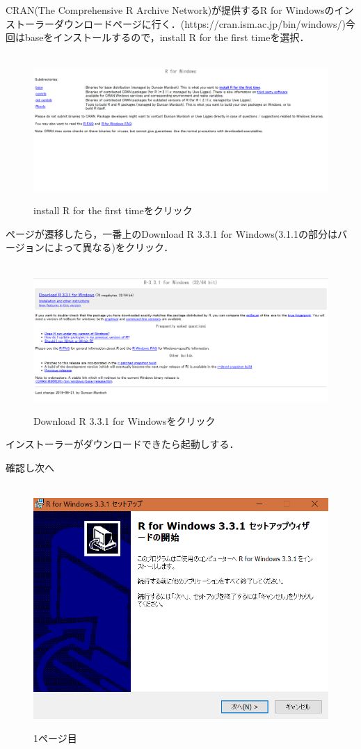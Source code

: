 CRAN(The Comprehensive R Archive Network)が提供するR for Windowsのインストーラーダウンロードページに行く．(https://cran.ism.ac.jp/bin/windows/)今回はbaseをインストールするので，install R for the first timeを選択．

\begin{figure}[htbp]
\centering　
\includegraphics[width=13cm]{rinst1.png}
\caption{install R for the first timeをクリック}
\end{figure}

\newpage
ページが遷移したら，一番上のDownload R 3.3.1 for Windows(3.1.1の部分はバージョンによって異なる)をクリック．

\begin{figure}[htbp]
\centering　
\includegraphics[width=13cm]{rinst2.png}
\caption{Download R 3.3.1 for Windowsをクリック}
\end{figure}

\newpage

インストーラーがダウンロードできたら起動しする．

確認し次へ
\begin{figure}[!htbp]
\centering　
\includegraphics[width=13cm]{rinstall1.png}
\caption{1ページ目}
\end{figure}

